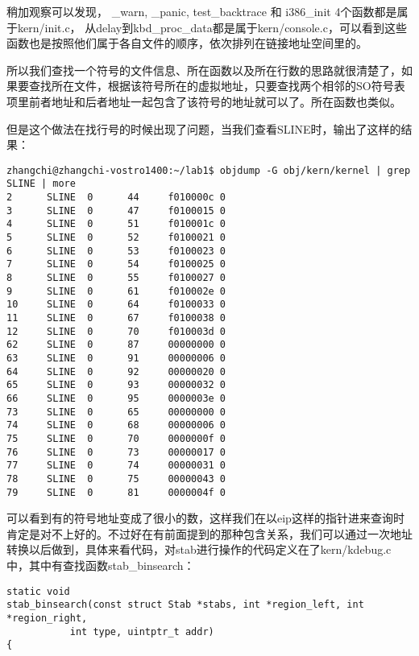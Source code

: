 \documentclass{article}
\newcommand{\funcname}[1]{{\ttfamily \small #1}}
\begin{document}
\begin{CJK*}{UTF8}{gkai}
\begin{lstlisting}[style=console]
\end{lstlisting}

稍加观察可以发现， \funcname{\_warn}, \funcname{\_panic}, \funcname{test\_backtrace} 和 \funcname{i386\_init} 4个函数都是属于kern/init.c， 从\funcname{delay}到\funcname{kbd\_proc\_data}都是属于kern/console.c，可以看到这些函数也是按照他们属于各自文件的顺序，依次排列在链接地址空间里的。

所以我们查找一个符号的文件信息、所在函数以及所在行数的思路就很清楚了，如果要查找所在文件，根据该符号所在的虚拟地址，只要查找两个相邻的SO符号表项里前者地址和后者地址一起包含了该符号的地址就可以了。所在函数也类似。

但是这个做法在找行号的时候出现了问题，当我们查看SLINE时，输出了这样的结果：

\begin{lstlisting}[style=console]
zhangchi@zhangchi-vostro1400:~/lab1$ objdump -G obj/kern/kernel | grep SLINE | more
2      SLINE  0      44     f010000c 0      
3      SLINE  0      47     f0100015 0      
4      SLINE  0      51     f010001c 0      
5      SLINE  0      52     f0100021 0      
6      SLINE  0      53     f0100023 0      
7      SLINE  0      54     f0100025 0      
8      SLINE  0      55     f0100027 0      
9      SLINE  0      61     f010002e 0      
10     SLINE  0      64     f0100033 0      
11     SLINE  0      67     f0100038 0      
12     SLINE  0      70     f010003d 0      
62     SLINE  0      87     00000000 0      
63     SLINE  0      91     00000006 0      
64     SLINE  0      92     00000020 0      
65     SLINE  0      93     00000032 0      
66     SLINE  0      95     0000003e 0      
73     SLINE  0      65     00000000 0      
74     SLINE  0      68     00000006 0      
75     SLINE  0      70     0000000f 0      
76     SLINE  0      73     00000017 0      
77     SLINE  0      74     00000031 0      
78     SLINE  0      75     00000043 0      
79     SLINE  0      81     0000004f 0      
\end{lstlisting}

可以看到有的符号地址变成了很小的数，这样我们在以eip这样的指针进来查询时肯定是对不上好的。不过好在有前面提到的那种包含关系，我们可以通过一次地址转换以后做到，具体来看代码，对stab进行操作的代码定义在了kern/kdebug.c中，其中有查找函数\funcname{stab\_binsearch}：

\begin{lstlisting}[style=ccode, title={\scriptsize \ttfamily \bfseries kern/kdebug.c}]
static void
stab_binsearch(const struct Stab *stabs, int *region_left, int *region_right,
	       int type, uintptr_t addr)
{\end{lstlisting}


\end{CJK*}
\end{document}
